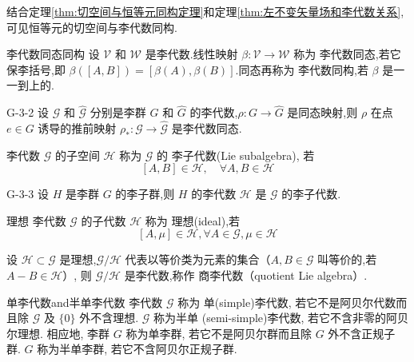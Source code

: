 \documentclass[../main.tex]{subfiles}
\begin{document}
     结合定理\ref{thm:切空间与恒等元同构定理}和定理\ref{thm:左不变矢量场和李代数关系},可见恒等元的切空间与李代数同构.
 \begin{definition}{}{李代数同态同构}
     设 $\mathscr{V}$ 和 $\mathscr{W}$ 是李代数.线性映射 $\beta : \mathscr{V}\rightarrow\mathscr{W}$ 称为 李代数同态,若它保李括号,即 $\beta([A,B]) = [\beta(A),\beta(B)]$.同态再称为 李代数同构,若 $\beta$ 是一一到上的.
 \end{definition}
 \begin{theorem}
   {}{G-3-2}
     设 $\mathscr{G}$ 和 $\hat{\mathscr{G}}$ 分别是李群 $G$ 和 $\hat{G}$ 的李代数,$\rho:G\rightarrow\hat{G}$ 是同态映射,则 $\rho$ 在点 $e\in G$ 诱导的推前映射 $\rho_*:\mathscr{G}\rightarrow\hat{\mathscr{G}}$ 是李代数同态.
 \end{theorem}
 \begin{definition}
     李代数 $\mathscr{G}$ 的子空间 $\mathscr{H}$ 称为 $\mathscr{G}$ 的  李子代数(Lie subalgebra), 若
     $$ [A, B]\in\mathscr{H},\quad \forall A, B \in \mathscr{H} $$
 \end{definition}
 \begin{theorem}{}{G-3-3}
     设 $H$ 是李群 $G$ 的李子群,则 $H$ 的李代数 $\mathscr{H}$ 是 $\mathscr{G}$ 的李子代数.
 \end{theorem}
\begin{definition}{}{理想}
	李代数 $\mathscr{G}$ 的子代数 $\mathscr{H}$ 称为 理想(ideal),若
	$$ [A,\mu] \in \mathscr{H},\forall  A\in\mathscr{G},\mu \in \mathscr{H} $$
\end{definition}
\begin{theorem}{}
	设 $\mathscr{H}\subset\mathscr{G}$ 是理想,$\mathscr{G}/\mathscr{H}$ 代表以等价类为元素的集合（$A,B\in \mathscr{G}$ 叫等价的,若 $A-B\in\mathscr{H}$）, 则 $\mathscr{G}/\mathscr{H}$ 是李代数,称作 商李代数（quotient Lie algebra）.
\end{theorem}
\begin{definition}{}{单李代数and半单李代数}
	李代数 $  \mathscr{G}  $ 称为 单(simple)李代数, 若它不是阿贝尔代数而且除 $\mathscr{G}  $ 及 $  \{0\}$ 外不含理想. $ \mathscr{G}$ 称为半单 (semi-simple)李代数, 若它不含非零的阿贝尔理想. 相应地, 李群 $  G  $ 称为单李群, 若它不是阿贝尔群而且除 $  G  $ 外不含正规子群. $ G  $ 称为半单李群, 若它不含阿贝尔正规子群.
\end{definition}
\end{document}

